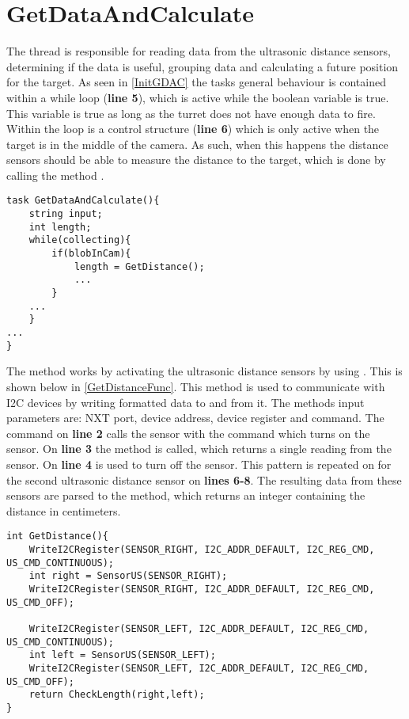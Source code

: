 \section{GetDataAndCalculate}
The thread  is responsible for reading data
from the ultrasonic distance sensors, determining if the data is useful,
grouping data and calculating a future position for the target. As seen in
\autoref{InitGDAC} the tasks general behaviour is contained within a while loop
(\textbf{line 5}), which is active while the boolean variable
 is true. This variable is true as long as the
turret does not have enough data to fire. Within the loop is a control structure
(\textbf{line 6}) which is only active when the target is in the middle of the
camera. As such, when this happens the distance sensors should be able to
measure the distance to the target, which is done by calling the method
.\nl

\begin{minipage}[H]{\linewidth}
\begin{lstlisting}[caption = General behaviour for GetDataAndCalculate, label = InitGDAC] 
task GetDataAndCalculate(){
    string input;
    int length;
    while(collecting){
        if(blobInCam){
            length = GetDistance();
            ...
        }
    ...
    }
...
}
\end{lstlisting}
\end{minipage}

The  method works by activating the ultrasonic distance
sensors by using . This is shown below in
\autoref{GetDistanceFunc}. This method is used to communicate with I2C devices
by writing formatted data to and from it. The methods input parameters are: NXT
port, device address, device register and command. The command on \textbf{line
2} calls the sensor with the command  which turns on
the sensor. On \textbf{line 3} the  method is called, which
returns a single reading from the sensor. On \textbf{line 4}
 is used to turn off the sensor. This pattern is repeated on
for the second ultrasonic distance sensor on \textbf{lines 6-8}. The resulting
data from these sensors are parsed to the  method, which
returns an integer containing the distance in centimeters.\nl

\begin{minipage}[H]{\linewidth}
\begin{lstlisting}[caption = Method for reading the distance from the ultrasonic distance sensors., label = GetDistanceFunc] 
int GetDistance(){
    WriteI2CRegister(SENSOR_RIGHT, I2C_ADDR_DEFAULT, I2C_REG_CMD, US_CMD_CONTINUOUS);
    int right = SensorUS(SENSOR_RIGHT);
    WriteI2CRegister(SENSOR_RIGHT, I2C_ADDR_DEFAULT, I2C_REG_CMD, US_CMD_OFF);

    WriteI2CRegister(SENSOR_LEFT, I2C_ADDR_DEFAULT, I2C_REG_CMD, US_CMD_CONTINUOUS);
    int left = SensorUS(SENSOR_LEFT);
    WriteI2CRegister(SENSOR_LEFT, I2C_ADDR_DEFAULT, I2C_REG_CMD, US_CMD_OFF);
    return CheckLength(right,left);
}
\end{lstlisting}
\end{minipage}

